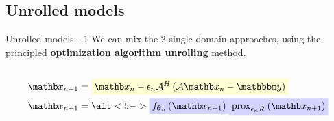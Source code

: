 \subsection{Unrolled models}
\begin{frame}{Unrolled models - 1}
    We can mix the 2 single domain approaches, using the principled \textbf{optimization algorithm unrolling} method.

    \begin{columns}[totalwidth=\textwidth]
        \begin{column}[]{0.3\textwidth}
            
            \begin{equation*}
                \begin{split}
                    \xb_{n+1} &= \highlight{yellow}{$\xb_n - \epsilon_n \mathcal{A}^H\left(\mathcal{A} \xb_n - \ybb\right)$}\\
                    \xb_{n+1} &= \alt<5->{\highlight{blue}{$f_{\thetab_n}\left(\xb_{n+1}\right)$}}{\highlight{blue}{$\operatorname{prox}_{\epsilon_n \mathcal{R}}\left(\xb_{n+1}\right)$}}
                \end{split}
            \end{equation*}
            

\end{column}
\end{columns}
\end{frame}
